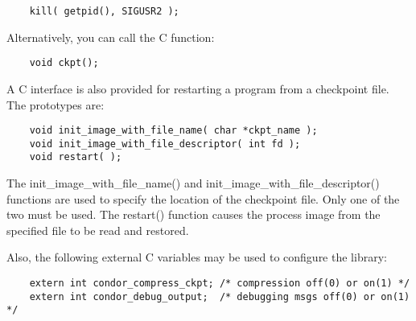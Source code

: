 \begin{verbatim}
	kill( getpid(), SIGUSR2 );
\end{verbatim}

Alternatively, you can call the C function:

\begin{verbatim}
	void ckpt();
\end{verbatim}

A C interface is also provided for restarting a program from a
checkpoint file.  The prototypes are:

\begin{verbatim}
	void init_image_with_file_name( char *ckpt_name );
	void init_image_with_file_descriptor( int fd );
	void restart( );
\end{verbatim}

The init\_image\_with\_file\_name() and
init\_image\_with\_file\_descriptor() functions are used to specify
the location of the checkpoint file.  Only one of the two must be
used.  The restart() function causes the process image from the
specified file to be read and restored.

Also, the following external C variables may be used to configure the
library:

\begin{verbatim}
	extern int condor_compress_ckpt; /* compression off(0) or on(1) */
	extern int condor_debug_output;  /* debugging msgs off(0) or on(1) */
\end{verbatim}
